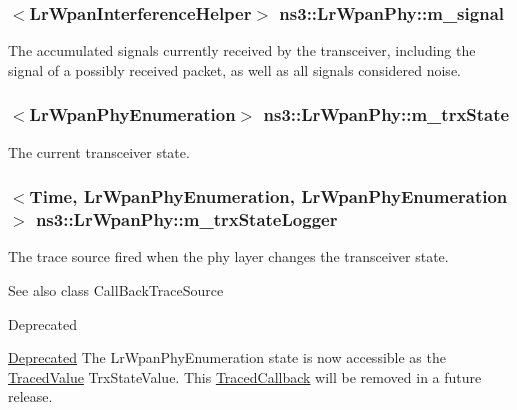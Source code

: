 \subsubsection[{\texorpdfstring{m\+\_\+signal}{m_signal}}]{$<${\bf Lr\+Wpan\+Interference\+Helper}$>$ ns3\+::\+Lr\+Wpan\+Phy\+::m\+\_\+signal\hspace{0.3cm}{\ttfamily [private]}}\hypertarget{classns3_1_1LrWpanPhy_a923130b0bacef678012bcc8fdc68fd10}{}\label{classns3_1_1LrWpanPhy_a923130b0bacef678012bcc8fdc68fd10}
The accumulated signals currently received by the transceiver, including the signal of a possibly received packet, as well as all signals considered noise. 
\subsubsection[{\texorpdfstring{m\+\_\+trx\+State}{m_trxState}}]{$<${\bf Lr\+Wpan\+Phy\+Enumeration}$>$ ns3\+::\+Lr\+Wpan\+Phy\+::m\+\_\+trx\+State\hspace{0.3cm}{\ttfamily [private]}}\hypertarget{classns3_1_1LrWpanPhy_a316704a4eb96e04f4b960ba3577fe0ce}{}\label{classns3_1_1LrWpanPhy_a316704a4eb96e04f4b960ba3577fe0ce}
The current transceiver state. 
\subsubsection[{\texorpdfstring{m\+\_\+trx\+State\+Logger}{m_trxStateLogger}}]{$<${\bf Time}, {\bf Lr\+Wpan\+Phy\+Enumeration}, {\bf Lr\+Wpan\+Phy\+Enumeration}$>$ ns3\+::\+Lr\+Wpan\+Phy\+::m\+\_\+trx\+State\+Logger\hspace{0.3cm}{\ttfamily [private]}}\hypertarget{classns3_1_1LrWpanPhy_ae48d12b3f7dd9ebc93ae1a7e0d570f52}{}\label{classns3_1_1LrWpanPhy_ae48d12b3f7dd9ebc93ae1a7e0d570f52}
The trace source fired when the phy layer changes the transceiver state.

\begin{DoxySeeAlso}{See also}
class Call\+Back\+Trace\+Source 
\end{DoxySeeAlso}
\begin{DoxyRefDesc}{Deprecated}
\item[\hyperlink{deprecated__deprecated000019}{Deprecated}]The Lr\+Wpan\+Phy\+Enumeration state is now accessible as the \hyperlink{classns3_1_1TracedValue}{Traced\+Value} {\ttfamily Trx\+State\+Value}. This \hyperlink{classns3_1_1TracedCallback}{Traced\+Callback} will be removed in a future release. \end{DoxyRefDesc}
